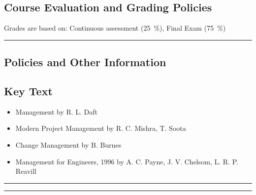 \subsection*{Course Evaluation and Grading Policies}
Grades are based on:
Continuous assessment (\qty{25}{\percent}),
Final Exam (\qty{75}{\percent})
\vspace{2ex}\hrule\vspace{2ex}



\subsection*{Policies and Other Information}
\subsection*{Key Text}

\begin{itemize}
    \item Management by R. L. Daft
    \item Modern Project Management by R. C. Mishra, T. Soota
    \item Change Management by B. Burnes
    \item Management for Engineers, 1996 by A. C. Payne, J. V. Chelsom, L. R. P. Reavill
\end{itemize}
\vspace{2ex}\hrule
\vspace{2ex}\hrule\vspace{2ex}